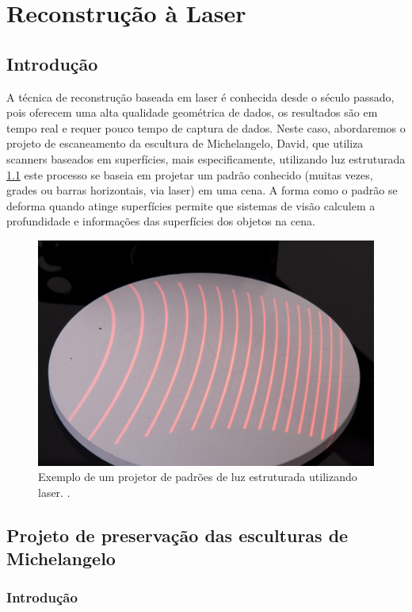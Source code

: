 \chapter{Reconstrução à Laser}\label{cap:laser}

\section*{Introdução}

A técnica de reconstrução baseada em laser é conhecida desde o século passado, pois oferecem uma alta qualidade geométrica de dados, os resultados são em tempo real e requer pouco tempo de captura de dados. 
Neste caso, abordaremos o projeto de escaneamento da escultura de Michelangelo, David, que utiliza scanners baseados em superfícies, mais especificamente, utilizando luz estruturada \ref{fig:luzestruturada} este processo se baseia em projetar um padrão conhecido (muitas vezes, grades ou barras horizontais, via laser) em uma cena. A forma como o padrão se deforma quando atinge superfícies permite que sistemas de visão calculem a profundidade e informações das superfícies dos objetos na cena.

\begin{figure}[!h]
	\centering
	\includegraphics[width=0.7\linewidth]{figs/luzestruturada.jpg}
	\caption{%
	Exemplo de um projetor de padrões de luz estruturada utilizando laser.
	\cite{luzEstruturada}.
	}\label{fig:luzestruturada}
\end{figure}

\section{Projeto de preservação das esculturas de Michelangelo}\label{sec:David}

\subsection*{Introdução}

